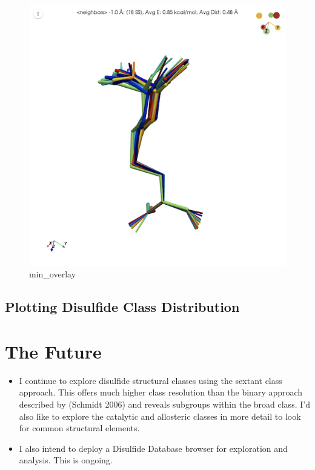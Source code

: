 \begin{figure}
\centering
\includegraphics{min_overlay.png}
\caption{min\_overlay}
\end{figure}

\hypertarget{plotting-disulfide-class-distribution}{%
\subsection{Plotting Disulfide Class
Distribution}\label{plotting-disulfide-class-distribution}}

\hypertarget{the-future}{%
\section{The Future}\label{the-future}}

\begin{itemize}
\item
  I continue to explore disulfide structural classes using the sextant
  class approach. This offers much higher class resolution than the
  binary approach described by (Schmidt 2006) and reveals subgroups
  within the broad class. I'd also like to explore the catalytic and
  allosteric classes in more detail to look for common structural
  elements.
\item
  I also intend to deploy a Disulfide Database browser for exploration
  and analysis. This is ongoing.
\end{itemize}

